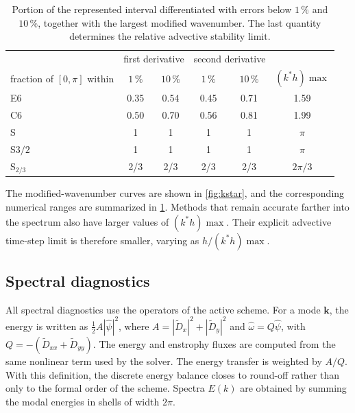 \documentclass[11pt,a4paper]{article}
\begin{document}
\begin{table}[t]
\centering\small
\begin{tabular}{lccccc}
\toprule
& \multicolumn{2}{c}{first derivative} & \multicolumn{2}{c}{second derivative} & \\
fraction of $[0,\pi]$ within & $1\,\%$ & $10\,\%$ & $1\,\%$ & $10\,\%$ & $(k^*h){\max}$ \\
\midrule
E6 & 0.35 & 0.54 & 0.45 & 0.71 & 1.59 \\
C6 & 0.50 & 0.70 & 0.56 & 0.81 & 1.99 \\
S & 1 & 1 & 1 & 1 & $\pi$ \\
S${3/2}$ & 1 & 1 & 1 & 1 & $\pi$ \\
S$_{2/3}$ & 2/3 & 2/3 & 2/3 & 2/3 & $2\pi/3$ \\
\bottomrule
\end{tabular}
\caption{Portion of the represented interval differentiated with errors below $1\,\%$ and $10\,\%$, together with the largest modified wavenumber. The last quantity determines the relative advective stability limit.}
\label{tab:kstar}
\end{table}
The modified-wavenumber curves are shown in \cref{fig:kstar}, and the corresponding numerical ranges are summarized in \cref{tab:kstar}. Methods that remain accurate farther into the spectrum also have larger values of $(k^*h){\max}$. Their explicit advective time-step limit is therefore smaller, varying as $h/(k^*h){\max}$.
\subsection{Spectral diagnostics}
All spectral diagnostics use the operators of the active scheme. For a mode $\mathbf k$, the energy is written as $\tfrac12A|\hat\psi|^2$, where
$A=|\tilde D_x|^2+|\tilde D_y|^2$ and
$\hat\omega=Q\hat\psi$, with
$Q=-(\tilde D_{xx}+\tilde D_{yy})$.
The energy and enstrophy fluxes are computed from the same nonlinear term used by the solver. The energy transfer is weighted by $A/Q$. With this definition, the discrete energy balance closes to round-off rather than only to the formal order of the scheme. Spectra $E(k)$ are obtained by summing the modal energies in shells of width $2\pi$.
\end{document}
